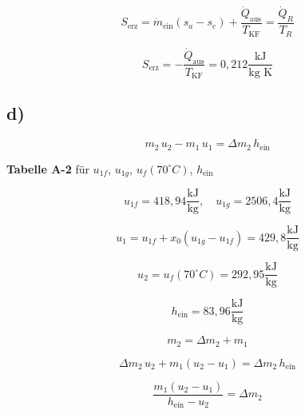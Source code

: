 \begin{equation*}
S_{\text{erz}} = \dot{m}_{\text{ein}} (s_a - s_e) + \frac{\dot{Q}_{\text{aus}}}{T_{\text{KF}}} = \frac{\dot{Q}_R}{T_R}
\end{equation*}

\begin{equation*}
S_{\text{erz}} = - \frac{\dot{Q}_{\text{aus}}}{T_{\text{KF}}} = 0{,}212 \frac{\text{kJ}}{\text{kg K}}
\end{equation*}

\subsection*{d)}

\begin{equation*}
m_2 \, u_2 - m_1 \, u_1 = \Delta m_2 \, h_{\text{ein}}
\end{equation*}

\textbf{Tabelle A-2} für $u_{1f}$, $u_{1g}$, $u_f (70^\circ C)$, $h_{\text{ein}}$

\begin{equation*}
u_{1f} = 418{,}94 \frac{\text{kJ}}{\text{kg}}, \quad u_{1g} = 2506{,}4 \frac{\text{kJ}}{\text{kg}}
\end{equation*}

\begin{equation*}
u_1 = u_{1f} + x_0 (u_{1g} - u_{1f}) = 429{,}8 \frac{\text{kJ}}{\text{kg}}
\end{equation*}

\begin{equation*}
u_2 = u_f (70^\circ C) = 292{,}95 \frac{\text{kJ}}{\text{kg}}
\end{equation*}

\begin{equation*}
h_{\text{ein}} = 83{,}96 \frac{\text{kJ}}{\text{kg}}
\end{equation*}

\begin{equation*}
m_2 = \Delta m_2 + m_1
\end{equation*}

\begin{equation*}
\Delta m_2 \, u_2 + m_1 (u_2 - u_1) = \Delta m_2 \, h_{\text{ein}}
\end{equation*}

\begin{equation*}
\frac{m_1 (u_2 - u_1)}{h_{\text{ein}} - u_2} = \Delta m_2
\end{equation*}

